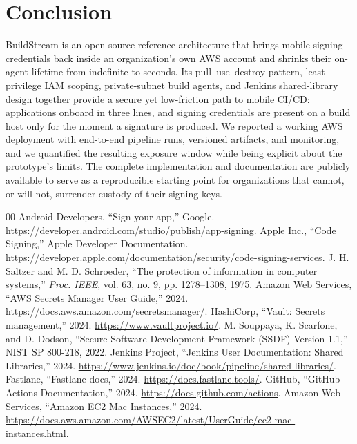 \documentclass[conference]{IEEEtran}
\begin{document}
\section{Conclusion}
BuildStream is an open-source reference architecture that brings mobile signing
credentials back inside an organization's own AWS account and shrinks their
on-agent lifetime from indefinite to seconds. Its pull--use--destroy pattern,
least-privilege IAM scoping, private-subnet build agents, and Jenkins
shared-library design together provide a secure yet low-friction path to mobile
CI/CD: applications onboard in three lines, and signing credentials are present
on a build host only for the moment a signature is produced. We reported a
working AWS deployment with end-to-end pipeline runs, versioned artifacts, and
monitoring, and we quantified the resulting exposure window while being explicit
about the prototype's limits. The complete implementation and documentation are
publicly available to serve as a reproducible starting point for organizations
that cannot, or will not, surrender custody of their signing keys.

\begin{thebibliography}{00}
 Android Developers, ``Sign your app,'' Google.
\url{https://developer.android.com/studio/publish/app-signing}.
 Apple Inc., ``Code Signing,'' Apple Developer Documentation.
\url{https://developer.apple.com/documentation/security/code-signing-services}.
 J. H. Saltzer and M. D. Schroeder, ``The protection of
information in computer systems,'' \emph{Proc. IEEE}, vol. 63, no. 9,
pp. 1278--1308, 1975.
 Amazon Web Services, ``AWS Secrets Manager User Guide,'' 2024.
\url{https://docs.aws.amazon.com/secretsmanager/}.
 HashiCorp, ``Vault: Secrets management,'' 2024.
\url{https://www.vaultproject.io/}.
 M. Souppaya, K. Scarfone, and D. Dodson, ``Secure Software
Development Framework (SSDF) Version 1.1,'' NIST SP 800-218, 2022.
 Jenkins Project, ``Jenkins User Documentation: Shared
Libraries,'' 2024. \url{https://www.jenkins.io/doc/book/pipeline/shared-libraries/}.
 Fastlane, ``Fastlane docs,'' 2024.
\url{https://docs.fastlane.tools/}.
 GitHub, ``GitHub Actions Documentation,'' 2024.
\url{https://docs.github.com/actions}.
 Amazon Web Services, ``Amazon EC2 Mac Instances,'' 2024.
\url{https://docs.aws.amazon.com/AWSEC2/latest/UserGuide/ec2-mac-instances.html}.
\end{thebibliography}
\end{document}

